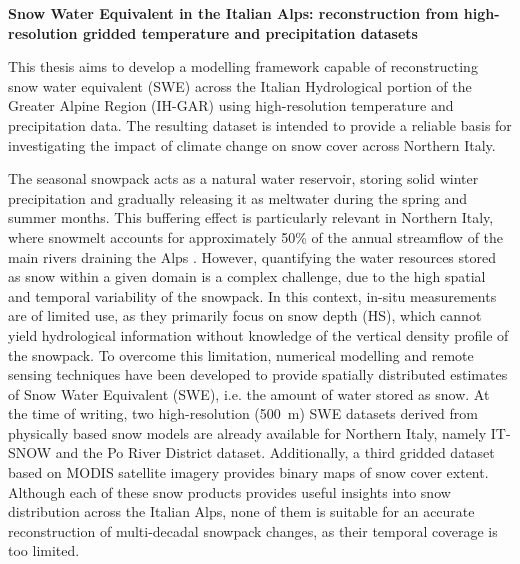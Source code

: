 \documentclass[12pt, a4paper]{article}
\begin{document}
\begin{center}
  {\large\bfseries Snow Water Equivalent in the Italian Alps: reconstruction from high-resolution 
  gridded temperature and precipitation datasets}
\end{center}

This thesis aims to develop a modelling framework capable of reconstructing snow water equivalent (SWE) across the Italian Hydrological portion of the Greater Alpine 
Region (IH-GAR) using high-resolution temperature and precipitation data. The resulting dataset is intended to provide a reliable basis for investigating 
the impact of climate change on snow cover across Northern Italy.

The seasonal snowpack acts as a natural water reservoir, storing solid winter precipitation and gradually releasing it as meltwater during the spring 
and summer months. This buffering effect is particularly relevant in Northern Italy, where snowmelt accounts for approximately 50\% of the annual 
streamflow of the main rivers draining the Alps \parencite{snow_drought}. However, quantifying the water resources stored as snow within a given domain is 
a complex challenge, due to the high spatial and temporal variability of the snowpack. In this context, in-situ measurements are of limited use, as 
they primarily focus on snow depth (HS), which cannot yield hydrological information without knowledge of the vertical density profile of the 
snowpack. To overcome this limitation, numerical modelling and remote sensing techniques have been developed to provide spatially distributed 
estimates of Snow Water Equivalent (SWE), i.e. the amount of water stored as snow. At the time of writing, two high-resolution (\SI{500}{\meter}) 
SWE datasets derived from physically based snow models are already available for Northern Italy, namely IT-SNOW and the Po River District dataset. 
Additionally, a third gridded dataset based on MODIS satellite imagery provides binary maps of snow cover extent. Although each of these snow products 
provides useful insights into snow distribution across the Italian Alps, none of them is suitable for an accurate reconstruction of multi-decadal 
snowpack changes, as their temporal coverage is too limited. 
\end{document}
